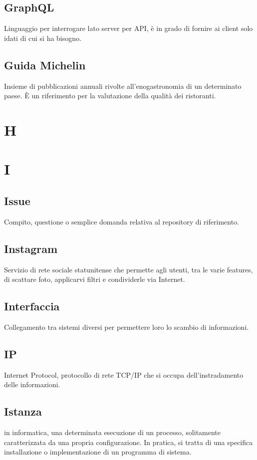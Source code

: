 \documentclass{classes/base}
\begin{document}
        \subsection*{GraphQL}
        Linguaggio per interrogare lato server per API, è in grado di fornire ai client solo idati di cui si ha bisogno.

        \subsection*{Guida Michelin} 
        Insieme di pubblicazioni annuali rivolte all'enogastronomia di un determinato paese. È un riferimento per la valutazione della qualità dei ristoranti.
        \newpage  
    \section{H}
    \newpage  
    \section{I}
        \subsection*{Issue}
        Compito, questione o semplice domanda relativa al repository di riferimento.
        
        \subsection*{Instagram}
        Servizio di rete sociale statunitense che permette agli utenti, tra le varie features, di scattare foto, applicarvi filtri e condividerle via Internet.
        
        \subsection*{Interfaccia}
        Collegamento tra sistemi diversi per permettere loro lo scambio di informazioni.

        \subsection*{IP}
        Internet Protocol, protocollo di rete TCP/IP che si occupa dell'instradamento delle informazioni.

        \subsection*{Istanza}
        in informatica, una determinata esecuzione di un processo, solitamente caratterizzata da una propria configurazione. In pratica, si tratta di una specifica installazione o implementazione di un programma di sistema.
        \newpage  
\end{document}
